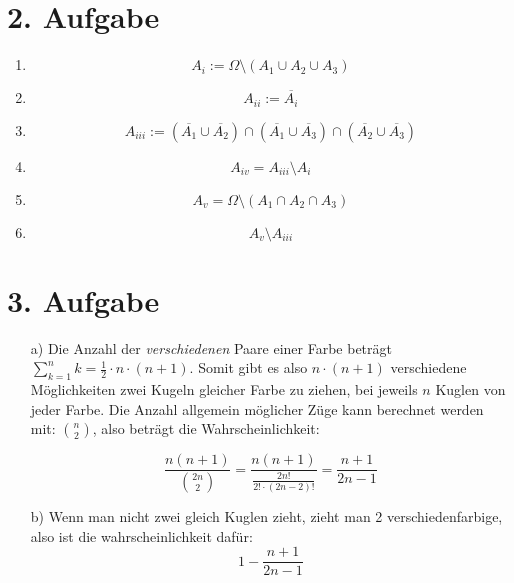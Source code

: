 \documentclass[10pt,a4paper,parskip=half]{scrartcl}
\begin{document}
\section*{2. Aufgabe}
\begin{enumerate}[\quad(i)]
	\item $$ A_i :=  \Omega \setminus (A_1 \cup A_2 \cup A_3)$$
	\item $$ A_{ii} := \overline{A_i} $$
	\item $$ A_{iii} :=  (\overline{A_1} \cup \overline{A_2}) \cap (\overline{A_1} \cup \overline{A_3}) \cap (\overline{A_2} \cup \overline{A_3}) $$
	\item $$A_{iv} = A_{iii} \setminus  A_i $$
	\item $$ A_{v} = \Omega \setminus (A_1 \cap A_2 \cap A_3) $$
	\item $$ A_v \setminus A_{iii} $$
\end{enumerate}
\section*{3. Aufgabe}
	\begin{enumerate}
		\item[a)] Die Anzahl der \textit{verschiedenen} Paare einer Farbe beträgt $\sum^n_{k=1} k = \frac12 \cdot n \cdot (n+1)$. 
		Somit gibt es also $n \cdot (n+1)$ verschiedene Möglichkeiten zwei Kugeln gleicher Farbe zu ziehen,
		bei jeweils $n$ Kuglen von jeder Farbe.
		Die Anzahl allgemein möglicher Züge kann berechnet werden mit: $\binom n2$,
		 also beträgt die Wahrscheinlichkeit:
		 
		 \[ \frac{n(n+1)}{\binom {2n}2} = \frac{n(n+1)}{\frac{2n!}{2! \cdot (2n - 2)!}} = \frac{n+1}{2n -1} \]
	\item[b)] Wenn man nicht zwei gleich Kuglen zieht, zieht man 2 verschiedenfarbige, also ist die wahrscheinlichkeit dafür:
	$$1 - \frac{n+1}{2n - 1} $$	
	\end{enumerate}
\end{document}
